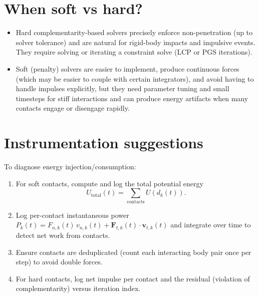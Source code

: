 \documentclass[11pt,a4paper]{article}
\begin{document}
\section{When soft vs hard?}
\begin{itemize}
  \item Hard complementarity-based solvers precisely enforce non-penetration (up to solver tolerance) and are natural for rigid-body impacts and impulsive events. They require solving or iterating a constraint solve (LCP or PGS iterations).
  \item Soft (penalty) solvers are easier to implement, produce continuous forces (which may be easier to couple with certain integrators), and avoid having to handle impulses explicitly, but they need parameter tuning and small timesteps for stiff interactions and can produce energy artifacts when many contacts engage or disengage rapidly.
\end{itemize}

\section{Instrumentation suggestions}
To diagnose energy injection/consumption:
\begin{enumerate}
  \item For soft contacts, compute and log the total potential energy
  \[ U_{\text{total}}(t) = \sum_{\text{contacts}} U(d_k(t)). \]
  \item Log per-contact instantaneous power \(P_k(t) = F_{n,k}(t)\, v_{n,k}(t) + \mathbf{F}_{t,k}(t) \cdot \mathbf{v}_{t,k}(t)\) and integrate over time to detect net work from contacts.
  \item Ensure contacts are deduplicated (count each interacting body pair once per step) to avoid double forces.
  \item For hard contacts, log net impulse per contact and the residual (violation of complementarity) versus iteration index.
\end{enumerate}
\end{document}
